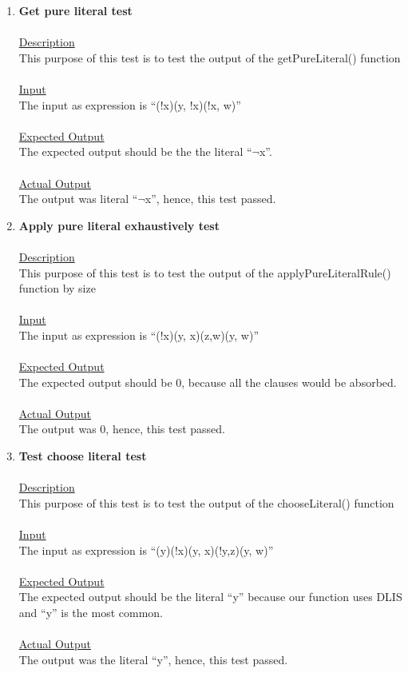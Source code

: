 \documentclass{article}
\newcommand{\quotes}[1]{``#1''}
\begin{document}
\begin{enumerate}
		\item \textbf{Get pure literal test}\\\\
		\underline{Description}\\
		\indent This purpose of this test is to test the output of the getPureLiteral() function\\\\
		\underline{Input}\\
		\indent The input as expression is \quotes{(!x)(y, !x)(!x, w)}\\	\\
		\underline{Expected Output}\\
		\indent The expected output should be the the literal \quotes{$\neg$x}.\\\\
		\underline{Actual Output}\\
		\indent The output was literal \quotes{$\neg$x}, hence, this test passed.\\
		
		\item \textbf{Apply pure literal exhaustively test}\\\\
		\underline{Description}\\
		\indent This purpose of this test is to test the output of the applyPureLiteralRule() function by size\\\\
		\underline{Input}\\
		\indent The input as expression is \quotes{(!x)(y, x)(z,w)(y, w)}\\	\\
		\underline{Expected Output}\\
		\indent The expected output should be 0, because all the clauses would be absorbed.\\\\
		\underline{Actual Output}\\
		\indent The output was 0, hence, this test passed.\\
		
		\item \textbf{Test choose literal test}\\\\
		\underline{Description}\\
		\indent This purpose of this test is to test the output of the chooseLiteral() function\\\\
		\underline{Input}\\
		\indent The input as expression is \quotes{(y)(!x)(y, x)(!y,z)(y, w)}\\	\\
		\underline{Expected Output}\\
		\indent The expected output should be the literal \quotes{y} because our function uses DLIS and \quotes{y} is the most common.\\\\
		\underline{Actual Output}\\
		\indent The output was the literal \quotes{y}, hence, this test passed.\\
		

\end{enumerate}
\end{document}

